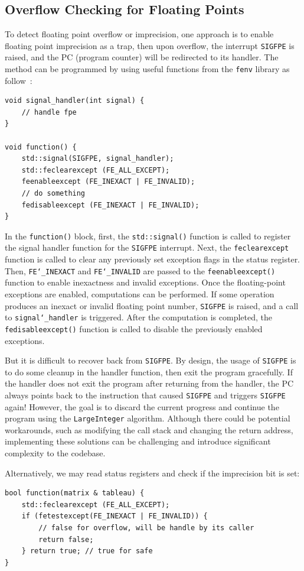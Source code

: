 \documentclass[logo,bsc,singlespacing,parskip]{infthesis}
\newcommand{\sigfpe}{\texttt{SIGFPE}}
\newcommand{\feinexact}{\texttt{FE\char`_INEXACT}}
\newcommand{\feinvalid}{\texttt{FE\char`_INVALID}}
\begin{document}
\subsection{Overflow Checking for Floating Points}
\label{sec:overflow-float}
To detect floating point overflow or imprecision, one approach is to enable
floating point imprecision as a trap, then upon overflow, the interrupt \sigfpe{}
is raised, and the PC (program counter) will be redirected to its handler. The
method can be programmed by using useful functions from the \texttt{fenv}
library as follow~\cite{fenvlib}:
\begin{verbatim}
void signal_handler(int signal) {
    // handle fpe
}

void function() {
    std::signal(SIGFPE, signal_handler);
    std::feclearexcept (FE_ALL_EXCEPT);
    feenableexcept (FE_INEXACT | FE_INVALID);
    // do something
    fedisableexcept (FE_INEXACT | FE_INVALID);
}
\end{verbatim}

In the \texttt{function()} block, first, the \texttt{std::signal()} function is
called to register the signal handler function for the \sigfpe{} interrupt. Next,
the \texttt{feclearexcept} function is called to clear any previously set
exception flags in the status register. Then, \feinexact{} and \feinvalid{} are
passed to the \texttt{feenableexcept()} function to enable inexactness and
invalid exceptions. Once the floating-point exceptions are enabled, 
computations can be performed. If some operation produces an inexact or invalid
floating point number, \sigfpe{} is raised, and a call to
\texttt{signal\char`_handler} is triggered. After the computation is completed,
the \texttt{fedisableexcept()} function is called to disable the previously
enabled exceptions. 

But it is difficult to recover back from \sigfpe{}. By design, the usage
of \sigfpe{} is to do some cleanup in the handler function, then exit the program
gracefully. If the handler does not exit the program after returning from the
handler, the PC always points back to the instruction that caused \sigfpe{} and
triggers \sigfpe{} again! However, the goal is to discard the current progress and
continue the program using the \texttt{LargeInteger}  algorithm. Although there could
be potential workarounds, such as modifying the call stack and changing the
return address, implementing these solutions can be challenging and
introduce significant complexity to the codebase.

Alternatively, we may read status registers and check if the imprecision bit is
set: 
\begin{verbatim}
bool function(matrix & tableau) {
    std::feclearexcept (FE_ALL_EXCEPT);
    if (fetestexcept(FE_INEXACT | FE_INVALID)) {
        // false for overflow, will be handle by its caller
        return false; 
    } return true; // true for safe
}
\end{verbatim}
\end{document}
